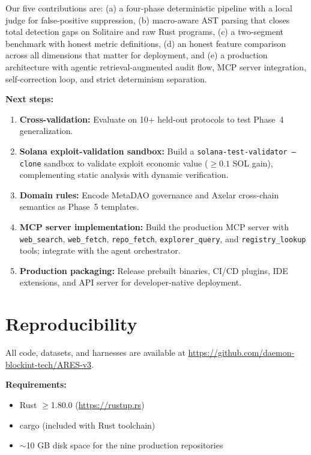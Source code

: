 \documentclass{article}
\begin{document}
Our five contributions are: (a) a four-phase deterministic pipeline with a local judge for false-positive suppression, (b) macro-aware AST parsing that closes total detection gaps on Solitaire and raw Rust programs, (c) a two-segment benchmark with honest metric definitions, (d) an honest feature comparison across all dimensions that matter for deployment, and (e) a production architecture with agentic retrieval-augmented audit flow, MCP server integration, self-correction loop, and strict determinism separation.

\textbf{Next steps:}
\begin{enumerate}
  \item \textbf{Cross-validation:} Evaluate on 10+ held-out protocols to test Phase~4 generalization.
  \item \textbf{Solana exploit-validation sandbox:} Build a \texttt{solana-test-validator --clone} sandbox to validate exploit economic value ($\geq0.1$ SOL gain), complementing static analysis with dynamic verification.
  \item \textbf{Domain rules:} Encode MetaDAO governance and Axelar cross-chain semantics as Phase~5 templates.
  \item \textbf{MCP server implementation:} Build the production MCP server with \texttt{web\_search}, \texttt{web\_fetch}, \texttt{repo\_fetch}, \texttt{explorer\_query}, and \texttt{registry\_lookup} tools; integrate with the agent orchestrator.
  \item \textbf{Production packaging:} Release prebuilt binaries, CI/CD plugins, IDE extensions, and API server for developer-native deployment.
\end{enumerate}






\appendix

\section{Reproducibility}
\label{sec:repro}

All code, datasets, and harnesses are available at \url{https://github.com/daemon-blockint-tech/ARES-v3}.

\textbf{Requirements:}
\begin{itemize}
  \item Rust $\geq$1.80.0 (\url{https://rustup.rs})
  \item cargo (included with Rust toolchain)
  \item $\sim$10 GB disk space for the nine production repositories
\end{itemize}
\end{document}
